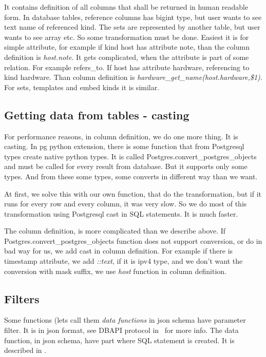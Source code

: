 \documentclass[deska]{subfiles}
\begin{document}
It contains definition of all columns that shall be returned in human readable form.
In database tables, reference columns has bigint type, but user wants to see text name of referenced kind.
The sets are represented by another table, but user wants to see array etc. So some transformation must be done.
Easiest it is for simple attribute,
for example if kind host has attribute note, than the column definition is {\em host.note}.
It gets complicated, when the attribute is part of some relation. For example refers\_to.
If host has attribute hardware, referencing to kind hardware. Than column definition is 
{\em hardware\_get\_name(host.hardware,\$1)}. For sets, templates and embed kinds it is similar.

\subsection{Getting data from tables - casting}
\label{sec:cast}
For performance reasons, in column definition, we do one more thing. It is casting.
In pg python extension, there is some function that from Postgresql types create native python types.
It is called Postgres.convert\_postgres\_objects
and must be called for every result from database. But it supports only some types.
And from these some types, some converts in different way than we want.

At first, we solve this with our own function, that do the transformation, but if it runs for every
row and every column, it was very slow. So we do most of this transformation using Postgresql cast
in SQL statements. It is much faster.

The column definition, is more complicated than we describe above. If
Postgres.convert\_postgres\_objects function 
does not support conversion, or do in bad way for us, we add cast in column definition.
For example if there is timestamp attribute, we add {\em ::text}, if it is ipv4 type, and we don't want
the conversion with mask suffix, we use {\em host} function in column definition.


\subsection{Filters}

Some functions (lets call them {\em data functions} in json schema have parameter filter. It is in json format,
see DBAPI protocol in~ for more info.
The data function, in json schema, have part where SQL statement is created. It is described in
.
\end{document}
